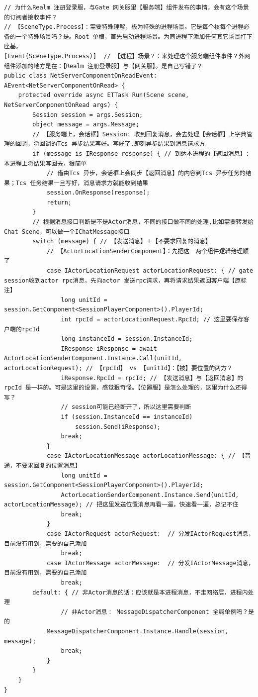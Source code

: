 \documentclass[9pt, b5paper]{article}
\begin{document}
\begin{verbatim}
// 为什么Realm 注册登录服，与Gate 网关服里【服务端】组件发布的事情，会有这个场景的订阅者接收事件？
// 【SceneType.Process】：需要特殊理解，极为特殊的进程场景。它是每个核每个进程必备的一个特殊场景吗？是。Root 单根，首先启动进程场景。为同进程下添加任何其它场景打下座基。
[Event(SceneType.Process)]  // 【进程】场景？：来处理这个服务端组件事件？外网组件添加的地方是在：【Realm 注册登录服】与【网关服】。是自己写错了？
public class NetServerComponentOnReadEvent: AEvent<NetServerComponentOnRead> {
    protected override async ETTask Run(Scene scene, NetServerComponentOnRead args) {
        Session session = args.Session;
        object message = args.Message;
        // 【服务端上，会话框】Session: 收到回复消息，会去处理【会话框】上字典管理的回调，将回调的Tcs 异步结果写好。写好了,即刻异步结果到消息请求方
        if (message is IResponse response) { // 到达本进程的【返回消息】: 本进程上将结果写回去，狠简单
            // 借由Tcs 异步，会话框上会同步【返回消息】的内容到Tcs 异步任务的结果；Tcs 任务结果一旦写好，消息请求方就能收到结果
            session.OnResponse(response); 
            return; 
        } 
        // 根据消息接口判断是不是Actor消息，不同的接口做不同的处理,比如需要转发给Chat Scene，可以做一个IChatMessage接口
        switch (message) { // 【发送消息】＋【不要求回复的消息】
            // 【ActorLocationSenderComponent】：先把这一两个组件逻辑给理顺了
            case IActorLocationRequest actorLocationRequest: { // gate session收到actor rpc消息，先向actor 发送rpc请求，再将请求结果返回客户端【原标注】 
                long unitId = session.GetComponent<SessionPlayerComponent>().PlayerId;
                int rpcId = actorLocationRequest.RpcId; // 这里要保存客户端的rpcId 
                long instanceId = session.InstanceId;
                IResponse iResponse = await ActorLocationSenderComponent.Instance.Call(unitId, actorLocationRequest); // 【rpcId】 vs 【unitId】：【被】要位置的两方？
                iResponse.RpcId = rpcId; // 【发送消息】与【返回消息】的 rpcId 是一样的。可是这里的设置，感觉狠奇怪。【位置服】是怎么处理的，这里为什么还得写？
                // session可能已经断开了，所以这里需要判断
                if (session.InstanceId == instanceId) 
                    session.Send(iResponse);
                break;
            }
            case IActorLocationMessage actorLocationMessage: { // 【普通，不要求回复的位置消息】
                long unitId = session.GetComponent<SessionPlayerComponent>().PlayerId;
                ActorLocationSenderComponent.Instance.Send(unitId, actorLocationMessage); // 把这里发送位置消息再看一遍，快速看一遍，总记不住
                break;
            }
            case IActorRequest actorRequest:  // 分发IActorRequest消息，目前没有用到，需要的自己添加 
                break;
            case IActorMessage actorMessage:  // 分发IActorMessage消息，目前没有用到，需要的自己添加 
                break;
        default: { // 非Actor消息的话：应该就是本进程消息，不走网络层，进程内处理
                // 非Actor消息： MessageDispatcherComponent 全局单例吗？是的
            MessageDispatcherComponent.Instance.Handle(session, message); 
                break;
            }
        }
    }
}
\end{verbatim}
\end{document}
